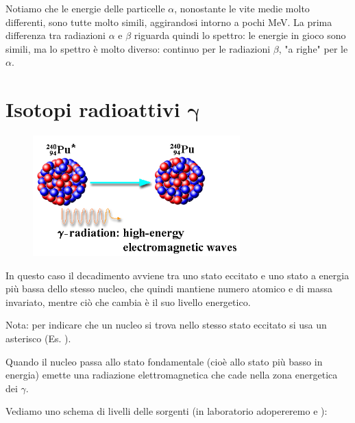 Notiamo che le energie delle particelle $\alpha$, nonostante le vite medie molto differenti, sono tutte molto simili, aggirandosi intorno a pochi MeV. La prima differenza tra radiazioni $\alpha$ e $\beta$ riguarda quindi lo spettro: le energie in gioco sono simili, ma lo spettro è molto diverso: continuo per le radiazioni $\beta$, "a righe" per le $\alpha$.

\section[Isotopi radioattivi \texorpdfstring{$\gamma$}{\textgamma}]
{Isotopi radioattivi $\boldsymbol{\gamma}$}

\vspace{-0.6cm}\begin{figure}[H]
    \centering
    \includegraphics[width=8cm]{immagini/decadimento_gamma.png}
\end{figure}

\vspace{-0.4cm}In questo caso il decadimento avviene tra uno stato eccitato e uno stato a energia più bassa dello stesso nucleo, che quindi mantiene numero atomico e di massa invariato, mentre ciò che cambia è il suo livello energetico.

Nota: per indicare che un nucleo si trova nello stesso stato eccitato si usa un asterisco (Es. ).

Quando il nucleo passa allo stato fondamentale (cioè allo stato più basso in energia) emette una radiazione elettromagnetica che cade nella zona energetica dei $\gamma$.

Vediamo uno schema di livelli delle sorgenti (in laboratorio adopereremo  e ):

